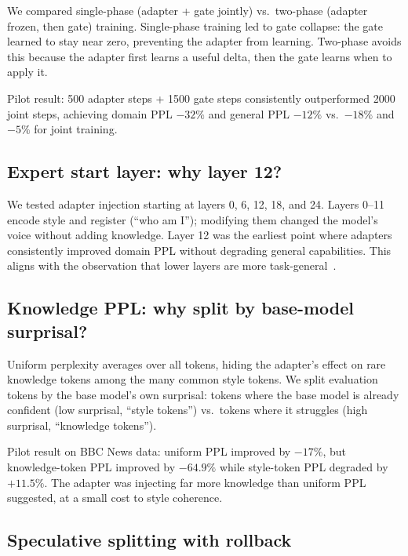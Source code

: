 \documentclass{article}
\begin{document}
We compared single-phase (adapter + gate jointly) vs.\ two-phase
(adapter frozen, then gate) training. Single-phase training led to
gate collapse: the gate learned to stay near zero, preventing the
adapter from learning. Two-phase avoids this because the adapter
first learns a useful delta, then the gate learns when to apply it.

Pilot result: 500 adapter steps + 1500 gate steps consistently
outperformed 2000 joint steps, achieving domain PPL $-32\%$ and
general PPL $-12\%$ vs.\ $-18\%$ and $-5\%$ for joint training.

\subsection{Expert start layer: why layer 12?}
\label{sec:pilot-expertstart}

We tested adapter injection starting at layers 0, 6, 12, 18, and 24.
Layers 0--11 encode style and register (``who am I''); modifying them
changed the model's voice without adding knowledge. Layer 12 was the
earliest point where adapters consistently improved domain PPL without
degrading general capabilities. This aligns with the observation that
lower layers are more task-general~\cite{li2018intrinsic}.

\subsection{Knowledge PPL: why split by base-model surprisal?}
\label{sec:pilot-knowledgeppl}

Uniform perplexity averages over all tokens, hiding the adapter's
effect on rare knowledge tokens among the many common style tokens.
We split evaluation tokens by the base model's own surprisal: tokens
where the base model is already confident (low surprisal, ``style
tokens'') vs.\ tokens where it struggles (high surprisal, ``knowledge
tokens'').

Pilot result on BBC News data: uniform PPL improved by $-17\%$, but
knowledge-token PPL improved by $-64.9\%$ while style-token PPL
degraded by $+11.5\%$. The adapter was injecting far more knowledge
than uniform PPL suggested, at a small cost to style coherence.

\subsection{Speculative splitting with rollback}
\label{sec:pilot-splitting}
\end{document}
